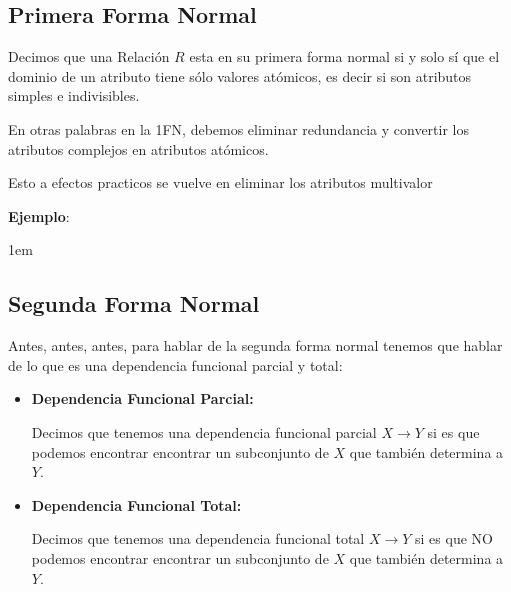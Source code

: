 \documentclass[12pt, fleqn]{report}                             %
\newenvironment{SmallIndentation}[1][0.75em]                    %
    {\begin{adjustwidth}{#1}{}\begin{footnotesize}}                 %
    {\end{footnotesize}\end{adjustwidth}}                           %
\newcommand \longto {\longrightarrow}                           %
\begin{document}
            \clearpage
            \subsection{Primera Forma Normal}

                Decimos que una Relación $R$ esta en su primera forma normal
                si y solo sí que el dominio de un atributo tiene sólo
                valores atómicos, es decir si son atributos simples e indivisibles.

                En otras palabras en la 1FN, debemos eliminar redundancia
                y convertir los atributos complejos en atributos atómicos.

                Esto a efectos practicos se vuelve en eliminar los atributos multivalor

                \vspace{2em}
                \textbf{Ejemplo}:
                \begin{SmallIndentation}[1em]
                \end{SmallIndentation}


            \clearpage
            \subsection{Segunda Forma Normal}

                Antes, antes, antes, para hablar de la segunda forma normal tenemos que 
                hablar de lo que es una dependencia funcional parcial y total:

                \begin{itemize}
                    \item \textbf{Dependencia Funcional Parcial:}

                        Decimos que tenemos una dependencia funcional parcial $X \longto Y$
                        si es que podemos encontrar encontrar un subconjunto de $X$ que también
                        determina a $Y$.

                    \item \textbf{Dependencia Funcional Total:}

                        Decimos que tenemos una dependencia funcional total $X \longto Y$
                        si es que NO podemos encontrar encontrar un subconjunto de $X$ que también
                        determina a $Y$.
                \end{itemize}
\end{document}
